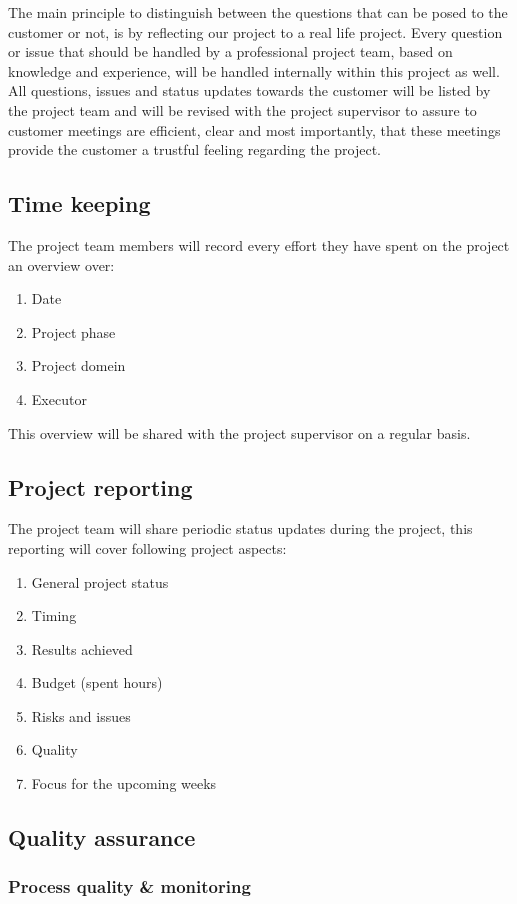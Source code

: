 The main principle to distinguish between the questions that can be posed to the customer or not, is by reflecting our project to a real life project. 
Every question or issue that should be handled by a professional project team, based on knowledge and experience, will be handled internally within this project as well.
All questions, issues and status updates towards the customer will be listed by the project team and will be revised with the project supervisor to assure to customer meetings are efficient, clear and most importantly, that these meetings provide the customer a trustful feeling regarding the project.
\subsection{Time keeping}
The project team members will record every effort they have spent on the project an overview over:
\begin{enumerate}
	\item Date
	\item Project phase
	\item Project domein
	\item Executor
\end {enumerate}
This overview will be shared with the project supervisor on a regular basis.
\subsection{Project reporting}
The project team will share periodic status updates during the project, this reporting will cover following project aspects:
\begin{enumerate}
	\item General project status
	\item Timing
	\item Results achieved
	\item Budget (spent hours)
	\item Risks and issues
	\item Quality
	\item Focus for the upcoming weeks
\end {enumerate}

\subsection{Quality assurance}
\lipsum[1]

\subsubsection{Process quality \& monitoring}
\lipsum[1]

